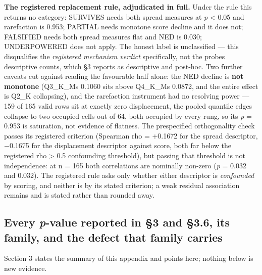 \textbf{The registered replacement rule, adjudicated in full.} Under the rule this returns no category: SURVIVES needs both spread measures at \emph{p} \textless{} 0.05 and rarefaction is 0.953; PARTIAL needs monotone score decline and it does not; FALSIFIED needs both spread measures flat and NED is 0.030; UNDERPOWERED does not apply. The honest label is unclassified --- this disqualifies the \emph{registered mechanism verdict} specifically, not the probe\textquotesingle s descriptive counts, which §3 reports as descriptive and post-hoc. Two further caveats cut against reading the favourable half alone: the NED decline is \textbf{not monotone} (Q3\_K\_M\textquotesingle s 0.1060 sits above Q4\_K\_M\textquotesingle s 0.0872, and the entire effect is Q2\_K collapsing), and the rarefaction instrument had no resolving power --- 159 of 165 valid rows sit at exactly zero displacement, the pooled quantile edges collapse to two occupied cells out of 64, both occupied by every rung, so its \emph{p} = 0.953 is saturation, not evidence of flatness. The prespecified orthogonality check passes its registered criterion (Spearman rho = +0.1672 for the spread descriptor, \(-\)0.1675 for the displacement descriptor against score, both far below the registered \textbar rho\textbar{} \textgreater{} 0.5 confounding threshold), but passing that threshold is not independence: at n = 165 both correlations are nominally non-zero (\emph{p} = 0.032 and 0.032). The registered rule asks only whether either descriptor is \emph{confounded} by scoring, and neither is by its stated criterion; a weak residual association remains and is stated rather than rounded away.

\hypertarget{every-p-value-reported-in-3-and-36-its-family-and-the-defect-that-family-carries}{%
\subsection{\texorpdfstring{Every \emph{p}-value reported in §3 and §3.6, its family, and the defect that family carries}{Every p-value reported in §3 and §3.6, its family, and the defect that family carries}}\label{every-p-value-reported-in-3-and-36-its-family-and-the-defect-that-family-carries}}

Section 3 states the summary of this appendix and points here; nothing below is new evidence.

